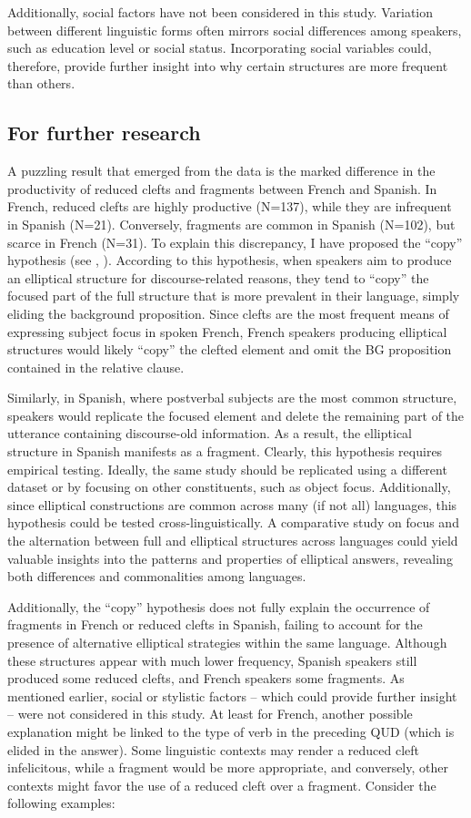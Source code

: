 Additionally, social factors have not been considered in this study. Variation between different linguistic forms often mirrors social differences among speakers, such as education level or social status. Incorporating social variables could, therefore, provide further insight into why certain structures are more frequent than others.

\subsection{For further research} \label{sub:7.5.2}
A puzzling result that emerged from the data is the marked difference in the productivity of reduced clefts and fragments between French and Spanish. In French, reduced clefts are highly productive (N=137), while they are infrequent in Spanish (N=21). Conversely, fragments are common in Spanish (N=102), but scarce in French (N=31). To explain this discrepancy, I have proposed the ``copy” hypothesis (see , ). According to this hypothesis, when speakers aim to produce an elliptical structure for discourse-related reasons, they tend to ``copy” the focused part of the full structure that is more prevalent in their language, simply eliding the background proposition. Since clefts are the most frequent means of expressing subject focus in spoken French, French speakers producing elliptical structures would likely ``copy” the clefted element and omit the BG proposition contained in the relative clause. 

Similarly, in Spanish, where postverbal subjects are the most common structure, speakers would replicate the focused element and delete the remaining part of the utterance containing discourse-old information. As a result, the elliptical structure in Spanish manifests as a fragment.
Clearly, this hypothesis requires empirical testing. Ideally, the same study should be replicated using a different dataset or by focusing on other constituents, such as object focus. Additionally, since elliptical constructions are common across many (if not all) languages, this hypothesis could be tested cross-linguistically. A comparative study on focus and the alternation between full and elliptical structures across languages could yield valuable insights into the patterns and properties of elliptical answers, revealing both differences and commonalities among languages.

Additionally, the ``copy” hypothesis does not fully explain the occurrence of fragments in French or reduced clefts in Spanish, failing to account for the presence of alternative elliptical strategies within the same language. Although these structures appear with much lower frequency, Spanish speakers still produced some reduced clefts, and French speakers some fragments. As mentioned earlier, social or stylistic factors -- which could provide further insight -- were not considered in this study. At least for French, another possible explanation might be linked to the type of verb in the preceding QUD (which is elided in the answer). Some linguistic contexts may render a reduced cleft infelicitous, while a fragment would be more appropriate, and conversely, other contexts might favor the use of a reduced cleft over a fragment. Consider the following examples: 

